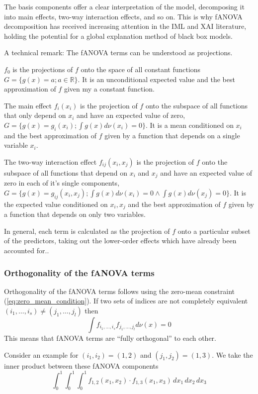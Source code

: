 The basis components offer a clear interpretation of the model, decomposing it into main effects, two-way interaction effects, and so on. This is why fANOVA decomposition has received increasing attention in the IML and XAI literature, holding the potential for a global explanation method of black box models.\par

A technical remark: The fANOVA terms can be understood as projections.\par

$f_0$ is the projections of $f$ onto the space of all constant functions $G = \{g(x) = a; a \in \mathbb{R}\}$. It is an unconditional expected value and the best approximation of $f$ given my a constant function.\par

The main effect $f_i(x_i)$ is the projection of $f$ onto the subspace of all functions that only depend on $x_i$ and have an expected value of zero, $G = \{g(x) = g_i(x_i); \int g(x) d\nu (x_i) = 0\}$. It is a mean conditioned on $x_i$ and the best approximation of $f$ given by a function that depends on a single variable $x_i$.\par

The two-way interaction effect $f_{ij}(x_i,x_j)$ is the projection of $f$ onto the subspace of all functions that depend on $x_i$ and $x_j$ and have an expected value of zero in each of it's single components, $G = \{g(x) = g_{ij}(x_i, x_j); \int g(x) d\nu (x_i) = 0 \land \int g(x) d\nu (x_j) = 0\}$. It is the expected value conditioned on $x_i, x_j$ and the best approximation of $f$ given by a function that depends on only two variables.\par
In general, \ldq each term is calculated as the projection of $f$ onto a particular subset of the predictors, taking out the lower-order effects which have already been accounted for.\rdq \cite{hooker2004}.\par

\subsubsection*{Orthogonality of the fANOVA terms}
Orthogonality of the fANOVA terms follows using the zero-mean constraint (\autoref{eq:zero_mean_condition}). If two sets of indices are not completely equivalent $(i_1, \dots, i_s) \neq (j_1, \dots, j_l)$ then
\begin{equation}
    \int f_{i_{1}, \dots, i_{s}} f_{j_{1}, \dots, j_{l}} d\nu(x) = 0
    \label{eq:orthogonality}
\end{equation}
This means that fANOVA terms are ``fully orthogonal'' to each other.\par
Consider an example for $(i_1, i_2) = (1, 2)$ and $(j_1, j_2) = (1, 3)$. We take the inner product between these fANOVA components
\[
\int_0^1 \int_0^1 \int_0^1 f_{1,2}(x_1, x_2) \cdot f_{1,3}(x_1, x_3) \, dx_1 \, dx_2 \, dx_3
\]

